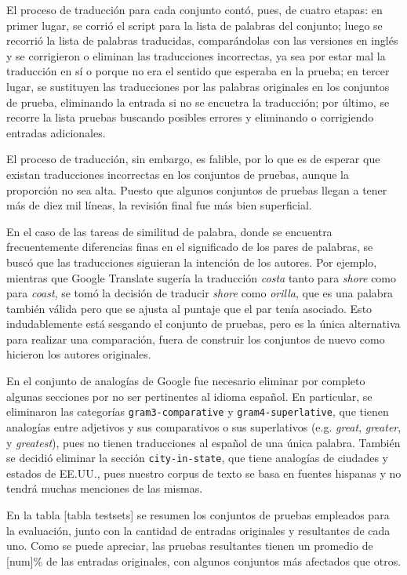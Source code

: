 El proceso de traducción para cada conjunto contó, pues, de cuatro etapas: en primer lugar, se
corrió el script para la lista de palabras del conjunto; luego se recorrió la lista de palabras
traducidas, comparándolas con las versiones en inglés y se corrigieron o eliminan las traducciones
incorrectas, ya sea por estar mal la traducción en sí o porque no era el sentido que esperaba en la
prueba; en tercer lugar, se sustituyen las traducciones por las palabras originales en los conjuntos
de prueba, eliminando la entrada si no se encuetra la traducción; por último, se recorre la lista
pruebas buscando posibles errores y eliminando o corrigiendo entradas adicionales.

El proceso de traducción, sin embargo, es falible, por lo que es de esperar que existan traducciones
incorrectas en los conjuntos de pruebas, aunque la proporción no sea alta. Puesto que algunos
conjuntos de pruebas llegan a tener más de diez mil líneas, la revisión final fue más bien
superficial.

En el caso de las tareas de similitud de palabra, donde se encuentra frecuentemente diferencias
finas en el significado de los pares de palabras, se buscó que las traducciones siguieran la
intención de los autores. Por ejemplo, mientras que Google Translate sugería la traducción
\textit{costa} tanto para \textit{shore} como para \textit{coast}, se tomó la decisión de traducir
\textit{shore} como \textit{orilla}, que es una palabra también válida pero que se ajusta al puntaje
que el par tenía asociado. Esto indudablemente está sesgando el conjunto de pruebas, pero es la
única alternativa para realizar una comparación, fuera de construir los conjuntos de nuevo como
hicieron los autores originales.

En el conjunto de analogías de Google fue necesario eliminar por completo algunas secciones por no
ser pertinentes al idioma español. En particular, se eliminaron las categorías
\texttt{gram3-comparative} y \texttt{gram4-superlative}, que tienen analogías entre adjetivos y sus
comparativos o sus superlativos (e.g. \textit{great}, \textit{greater}, y \textit{greatest}), pues
no tienen traducciones al español de una única palabra. También se decidió eliminar la sección
\texttt{city-in-state}, que tiene analogías de ciudades y estados de EE.UU., pues nuestro corpus de
texto se basa en fuentes hispanas y no tendrá muchas menciones de las mismas.

En la tabla [tabla testsets] se resumen los conjuntos de pruebas empleados para la evaluación, junto
con la cantidad de entradas originales y resultantes de cada uno. Como se puede apreciar, las
pruebas resultantes tienen un promedio de [num]\% de las entradas originales, con algunos conjuntos
más afectados que otros.

